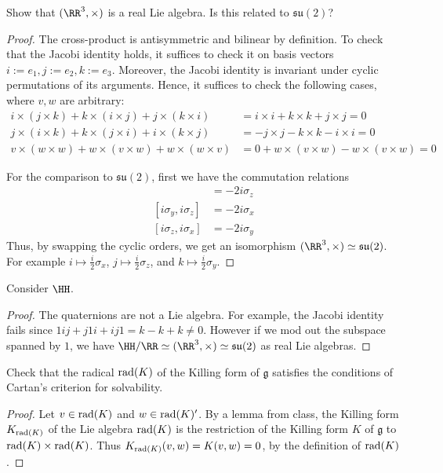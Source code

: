 \documentclass{article}
\begin{document}
  Show that $(\RR^3, \times)$ is a real Lie algebra.  Is this related to $\mathfrak{su}(2)$?
\begin{proof}
The cross-product is antisymmetric and bilinear by definition.  To check that the Jacobi identity holds, it suffices to check it on basis vectors $i := e_1, j:= e_2, k := e_3$.  Moreover, the Jacobi identity is invariant under cyclic permutations of its arguments.  Hence, it suffices to check the following cases, where $v,w$ are arbitrary:
\begin{align*}
i \times (j \times k) + k \times (i \times j) + j \times (k \times i) & = i \times i + k \times k + j \times j = 0 \\
j \times (i \times k) + k \times (j \times i) + i \times (k \times j) & = - j \times j  - k \times k - i \times i = 0 \\
v \times (w \times w) + w \times (v \times w) + w \times (w \times v) & = 0 + w \times (v \times w) - w \times (v \times w) = 0
\end{align*}

For the comparison to $\mathfrak{su}(2)$, first we have the commutation relations
\begin{align*}
[i\sigma_x, i\sigma_y] & = -2 i\sigma_z \\
[i\sigma_y, i\sigma_z] & = -2 i\sigma_x \\
[i\sigma_z, i\sigma_x] & = -2 i\sigma_y 
\end{align*}
Thus, by swapping the cyclic orders, we get an isomorphism  $(\RR^3, \times) \simeq \mathfrak{su}(2)$.  For example $i \mapsto \frac{i}{2} \sigma_x$, $j \mapsto \frac{i}{2} \sigma_z$, and $k \mapsto \frac{i}{2} \sigma_y$.  
\end{proof}

 Consider $\HH$.
\begin{proof}
The quaternions are not a Lie algebra.  For example, the Jacobi identity fails since
$1ij + j1i + ij1 = k -k + k \neq 0$.  However if we mod out the subspace spanned by $1$,
 we have $\HH/\RR \simeq (\RR^3, \times) \simeq  \mathfrak{su}(2)$ as real Lie algebras.
\end{proof}

\newcommand{\mf}{\mathfrak}

 Check that the radical $\operatorname{rad}(K)$ of the Killing form of $\mathfrak{g}$ satisfies
the conditions of Cartan's criterion for solvability.
\begin{proof}
Let $v \in \operatorname{rad}(K)$ and $w \in \operatorname{rad}(K)'$. 
By a lemma from class, the Killing form $K_{\operatorname{rad}(K)}$ of the Lie algebra $\operatorname{rad}(K)$ 
is the restriction of the Killing form $K$ of $\mf g$ to $\operatorname{rad}(K) \times \operatorname{rad}(K)$.
Thus $K_{\operatorname{rad}(K)}(v,w) = K(v,w) = 0$, by the definition of $\operatorname{rad}(K)$.
\end{proof}
\end{document}
